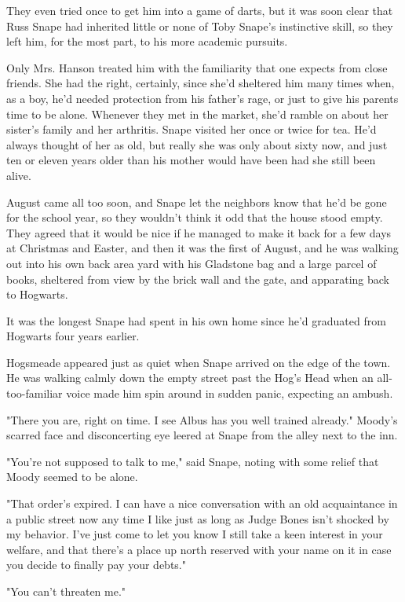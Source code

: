 \documentclass[a4paper,11pt]{article}
\begin{document}
They even tried once to get him into a game of darts, but it was soon clear that Russ Snape had inherited little or none of Toby Snape's instinctive skill, so they left him, for the most part, to his more academic pursuits.

Only Mrs. Hanson treated him with the familiarity that one expects from close friends. She had the right, certainly, since she'd sheltered him many times when, as a boy, he'd needed protection from his father's rage, or just to give his parents time to be alone. Whenever they met in the market, she'd ramble on about her sister's family and her arthritis. Snape visited her once or twice for tea. He'd always thought of her as old, but really she was only about sixty now, and just ten or eleven years older than his mother would have been had she still been alive.

August came all too soon, and Snape let the neighbors know that he'd be gone for the school year, so they wouldn't think it odd that the house stood empty. They agreed that it would be nice if he managed to make it back for a few days at Christmas and Easter, and then it was the first of August, and he was walking out into his own back area yard with his Gladstone bag and a large parcel of books, sheltered from view by the brick wall and the gate, and apparating back to Hogwarts.

It was the longest Snape had spent in his own home since he'd graduated from Hogwarts four years earlier.

Hogsmeade appeared just as quiet when Snape arrived on the edge of the town. He was walking calmly down the empty street past the Hog's Head when an all-too-familiar voice made him spin around in sudden panic, expecting an ambush.

"There you are, right on time. I see Albus has you well trained already." Moody's scarred face and disconcerting eye leered at Snape from the alley next to the inn.

"You're not supposed to talk to me," said Snape, noting with some relief that Moody seemed to be alone.

"That order's expired. I can have a nice conversation with an old acquaintance in a public street now any time I like just as long as Judge Bones isn't shocked by my behavior. I've just come to let you know I still take a keen interest in your welfare, and that there's a place up north reserved with your name on it in case you decide to finally pay your debts."

"You can't threaten me."
\end{document}
